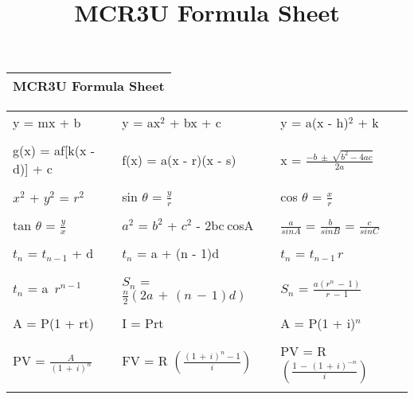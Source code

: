 \documentclass[30pt]{article}
\title{MCR3U Formula Sheet}
\begin{document}
\begin{LARGE}

\begin{table}
\Huge
\begin{tabular}{ |l| }
  \hline
  \textbf{MCR3U Formula Sheet}\\
  \hline
\end{tabular}
\end{table}

\setlength{\tabcolsep}{20pt}
\begin{table}
\LARGE
\begin{tabular}{l l l}
\renewcommand{\arraystretch}{2}

y = mx + b & y = ax$^2$ + bx + c  & y = a(x - h)$^2$ + k\\
\\
g(x) = af[k(x - d)] + c & f(x) = a(x - r)(x - s) & x = $\frac{-b \: \pm \: \sqrt {b^2 - 4ac}}{2a}$\\
\\
$x^2$ + $y^2$ = $r^2$ & sin $\theta$ = $\frac{y}{r}$ & cos $\theta$ = $\frac{x}{r}$\\
\\
tan $\theta$ = $\frac{y}{x}$ & $a^2$ = $b^2$ + $c^2$ - 2bc$\:$cosA & $\frac{a}{sinA}$ = $\frac{b}{sinB}$ = $\frac{c}{sinC}$\\
\\
$t_n$ = $t_{n-1}$ + d & $t_n$ = a + (n - 1)d & $t_n$ = $t_{n-1} \, r$\\
\\
$t_n$ = a $\, r^{n-1}$ & $S_n$ = $\frac{n}{2} \left( 2a \, + \, (n \, - \, 1)d \right)$ & $S_n$ = $\frac{a \left(r^n \, - \, 1 \right)}{r \, - \, 1}$\\
\\
A = P(1 + rt) & I = Prt & A = P(1 + i)$^n$ \\
\\
PV = $\frac{A}{(1 \, + \, i)^n}$ & FV = R $ \left(\frac{(1 \, + \, i)^n -1}{i} \right)$ & PV = R $ \left(\frac{1 \, - \, (1 \, + \, i)^{-n}}{i} \right)$ 
\\
\\

\end{tabular}
\end{table}
\end{LARGE}
\end{document}
